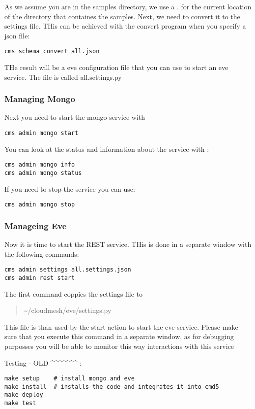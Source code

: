 As we assume you are in the samples directory, we use a . for the
current location of the directory that containes the samples. Next, we
need to convert it to the settings file. THis can be achieved with the
convert program when you specify a json file:

\begin{verbatim}
cms schema convert all.json
\end{verbatim}

THe result will be a eve configuration file that you can use to start an
eve service. The file is called all.settings.py

\subsubsection{Managing Mongo}\label{managing-mongo}

Next you need to start the mongo service with

\begin{verbatim}
cms admin mongo start
\end{verbatim}

You can look at the status and information about the service with :

\begin{verbatim}
cms admin mongo info
cms admin mongo status
\end{verbatim}

If you need to stop the service you can use:

\begin{verbatim}
cms admin mongo stop
\end{verbatim}

\subsubsection{Manageing Eve}\label{manageing-eve}

Now it is time to start the REST service. THis is done in a separate
window with the following commands:

\begin{verbatim}
cms admin settings all.settings.json
cms admin rest start
\end{verbatim}

The first command coppies the settings file to

\begin{quote}
\textasciitilde{}/cloudmesh/eve/settings.py
\end{quote}

This file is than used by the start action to start the eve service.
Please make sure that you execute this command in a separate window, as
for debugging purposses you will be able to monitor this way
interactions with this service

Testing - OLD \^{}\^{}\^{}\^{}\^{}\^{}\^{} :

\begin{verbatim}
make setup    # install mongo and eve
make install  # installs the code and integrates it into cmd5
make deploy
make test
\end{verbatim}

